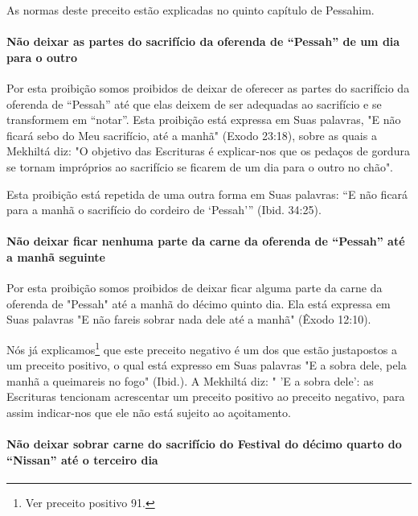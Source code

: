As normas deste preceito estão explicadas no quinto capítulo de
Pessahim.

\paragraph{Não deixar as partes do sacrifício da oferenda de ``Pessah'' de um dia
para o outro}

Por esta proibição somos proibidos de deixar de oferecer as partes do
sacrifício da oferenda de ``Pessah'' até que elas deixem de ser
adequadas ao sacrifício e se transformem em ``notar''. Esta proibição
está expressa em Suas palavras, "E não ficará sebo do Meu sacrifício,
até a manhã" (Exodo 23:18), sobre as quais a Mekhiltá diz: "O objetivo
das Escrituras é explicar-nos que os pedaços de gordura se tornam
impróprios ao sacrifício se ficarem de um dia para o outro no chão".

Esta proibição está repetida de uma outra forma em Suas palavras: ``E
não ficará para a manhã o sacrifício do cordeiro de `Pessah''' (Ibid.
34:25).

\paragraph{Não deixar ficar nenhuma parte da carne da oferenda
de ``Pessah'' até a manhã seguinte}

Por esta proibição somos proibidos de deixar ficar alguma parte da carne
da oferenda de "Pessah" até a manhã do décimo quinto dia. Ela está
expressa em Suas palavras "E não fareis sobrar nada dele até a manhã"
(Êxodo 12:10).

Nós já explicamos\footnote{Ver preceito positivo 91.} que este preceito negativo é um
dos que estão justapostos a um preceito positivo, o qual está expresso
em Suas palavras "E a sobra dele, pela manhã a queimareis no fogo"
(Ibid.). A Mekhiltá diz: " 'E a sobra dele': as Escrituras tencionam
acrescentar um preceito positivo ao preceito negativo, para assim
indicar-nos que ele não está sujeito ao açoitamento.

\paragraph{Não deixar sobrar carne do sacrifício do Festival do décimo quarto
do ``Nissan'' até o terceiro dia}

